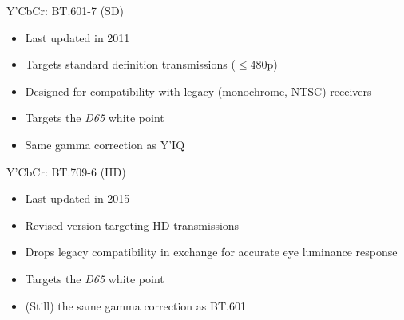 \documentclass[aspectratio=169,handout,usepdftitle=false]{fireshonks}
\begin{document}
\begin{frame}{Y'CbCr: BT.601-7 (SD)}
    \begin{itemize}
        \item Last updated in 2011 \autocite{BT601}
        \item Targets standard definition transmissions ($\leq$480p)
        \item Designed for compatibility with legacy (monochrome, NTSC) receivers
        \item Targets the \emph{D65} white point
        \item Same gamma correction as Y'IQ
    \end{itemize}

\end{frame}
\begin{frame}{Y'CbCr: BT.709-6 (HD)}
    \begin{itemize}
        \item Last updated in 2015 \autocite{BT709}
        \item Revised version targeting HD transmissions
        \item Drops legacy compatibility in exchange for accurate eye luminance response
        \item Targets the \emph{D65} white point
        \item (Still) the same gamma correction as BT.601
    \end{itemize}

\end{frame}
\end{document}
